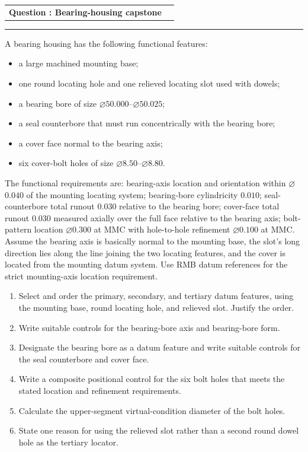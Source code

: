 \documentclass[11pt,a4paper]{article}
\makeatletter
\newcommand{\dia}{\ensuremath{\varnothing}}
\newcommand{\leveltag}[1]{%
  \fcolorbox{navy}{softgray}{\strut\small\bfseries\color{navy}#1}%
}
\newcommand{\qhead}[2]{%
  \clearpage
  \noindent\begin{tabularx}{\linewidth}{@{}Xr@{}}
  {\Large\bfseries\color{navy}Question \thequestion: #1} & \leveltag{#2}
  \end{tabularx}\par\vspace{-1mm}
  \noindent\rule{\linewidth}{0.6pt}\par\vspace{1mm}
}
\newcounter{question}
\newcommand{\question}[2]{\stepcounter{question}\qhead{#1}{#2}}
\makeatother
\begin{document}
\question{Bearing-housing capstone}{Level III}

A bearing housing has the following functional features:

\begin{itemize}[leftmargin=7mm,itemsep=1pt]
\item a large machined mounting base;
\item one round locating hole and one relieved locating slot used with dowels;
\item a bearing bore of size \dia$50.000$--\dia$50.025$;
\item a seal counterbore that must run concentrically with the bearing bore;
\item a cover face normal to the bearing axis;
\item six cover-bolt holes of size \dia$8.50$--\dia$8.80$.
\end{itemize}

The functional requirements are: bearing-axis location and orientation within \dia$0.040$ of the mounting locating system; bearing-bore cylindricity $0.010$; seal-counterbore total runout $0.030$ relative to the bearing bore; cover-face total runout $0.030$ measured axially over the full face relative to the bearing axis; bolt-pattern location \dia$0.300$ at MMC with hole-to-hole refinement \dia$0.100$ at MMC. Assume the bearing axis is basically normal to the mounting base, the slot's long direction lies along the line joining the two locating features, and the cover is located from the mounting datum system. Use RMB datum references for the strict mounting-axis location requirement.

\begin{enumerate}[label=(\alph*)]
\item Select and order the primary, secondary, and tertiary datum features, using the mounting base, round locating hole, and relieved slot. Justify the order.
\item Write suitable controls for the bearing-bore axis and bearing-bore form.
\item Designate the bearing bore as a datum feature and write suitable controls for the seal counterbore and cover face.
\item Write a composite positional control for the six bolt holes that meets the stated location and refinement requirements.
\item Calculate the upper-segment virtual-condition diameter of the bolt holes.
\item State one reason for using the relieved slot rather than a second round dowel hole as the tertiary locator.
\end{enumerate}
\end{document}
